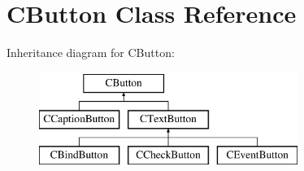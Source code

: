 \hypertarget{classCButton}{\section{C\-Button Class Reference}
\label{classCButton}
}
Inheritance diagram for C\-Button\-:\begin{figure}[H]
\begin{center}
\leavevmode
\includegraphics[height=3.000000cm]{classCButton}
\end{center}
\end{figure}
